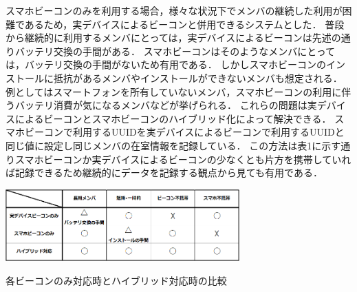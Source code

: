 スマホビーコンのみを利用する場合，様々な状況下でメンバの継続した利用が困難であるため，実デバイスによるビーコンと併用できるシステムとした．
普段から継続的に利用するメンバにとっては，実デバイスによるビーコンは先述の通りバッテリ交換の手間がある．
スマホビーコンはそのようなメンバにとっては，バッテリ交換の手間がないため有用である．
しかしスマホビーコンのインストールに抵抗があるメンバやインストールができないメンバも想定される．
例としてはスマートフォンを所有していないメンバ，スマホビーコンの利用に伴うバッテリ消費が気になるメンバなどが挙げられる．
これらの問題は実デバイスによるビーコンとスマホビーコンのハイブリッド化によって解決できる．
スマホビーコンで利用するUUIDを実デバイスによるビーコンで利用するUUIDと同じ値に設定し同じメンバの在室情報を記録している．
この方法は表1に示す通りスマホビーコンか実デバイスによるビーコンの少なくとも片方を携帯していれば記録できるため継続的にデータを記録する観点から見ても有用である．
\begin{table}[tbh]
  \centering
  \includegraphics[width=9cm]{image/table.png}
  \caption{各ビーコンのみ対応時とハイブリッド対応時の比較}
  \label{multipleBPM}
\end{table}